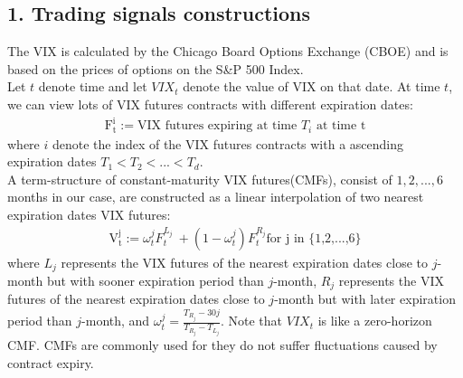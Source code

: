 \documentclass[10pt,letterpaper]{article}
\begin{document}
\subsection*{1. Trading signals constructions}
The VIX is calculated by the Chicago Board Options Exchange (CBOE) and is based on the prices of options on the S\&P 500 Index.
\\Let $t$ denote time and let $VIX_t$ denote the value of VIX on that date. At time $t$,
we can view lots of VIX futures contracts with different expiration dates:
\begin{eqnarray}
    \mathrm{F^i_t} := \text{VIX futures expiring at time $T_i$ at time t}
\end{eqnarray}
where $i$ denote the index of the VIX futures contracts with a ascending expiration dates $T_1 < T_2 < ... < T_d$.
\\A term-structure of constant-maturity VIX futures(CMFs), consist of \({1,2,...,6}\) months in our case, are constructed as
a linear interpolation of two nearest expiration dates VIX futures:
\begin{eqnarray}
\label{eq:defineV}
    \mathrm{V^j_t} := \omega^j_tF^{L_j}_t\ + (1 - \omega^j_t)F^{R_j}_t \text{for j in \{1,2,...,6\}}
\end{eqnarray}
where $L_j$ represents the VIX futures of the nearest expiration dates close to $j$-month but with sooner expiration period than $j$-month,
$R_j$ represents the VIX futures of the nearest expiration dates close to $j$-month but with later expiration period than $j$-month, and
$\omega^j_t = \frac{T_{R_j} - 30j}{T_{R_j} - T_{L_j}}$. Note that $VIX_t$ is like a zero-horizon CMF.
CMFs are commonly used for they do not suffer fluctuations caused by contract expiry.
\end{document}
